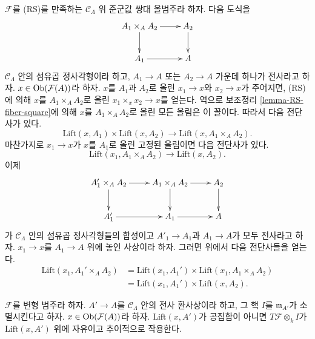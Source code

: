 \begin{remark}
\label{remark-lift-bijections}
$\mathcal{F}$를 (RS)를 만족하는 $\mathcal
C_\Lambda$ 위 준군값 쌍대 올범주라 하자. 다음 도식을
$$
\xymatrix{
A_1 \times_A A_2 \ar[r] \ar[d] & A_2 \ar[d] \\
A_1 \ar[r] & A
}
$$
$\mathcal{C}_\Lambda$ 안의 섬유곱 정사각형이라 하고,
$A_1 \to A$ 또는 $A_2 \to A$ 가운데 하나가 전사라고 하자.
$x \in \mathop{\mathrm{Ob}}\nolimits(\mathcal{F}(A))$라 하자. $x$를 $A_1$과 $A_2$로 올린
$x_1 \to x$와 $x_2 \to x$가 주어지면, (RS)에 의해
$x$를 $A_1 \times_A A_2$로 올린
$x_1 \times_x x_2 \to x$를 얻는다. 역으로 보조정리
\ref{lemma-RS-fiber-square}에 의해 $x$를 $A_1 \times_A A_2$로 올린
모든 올림은 이 꼴이다. 따라서 다음 전단사가 있다. %
$$
\text{Lift}(x, A_1) \times \text{Lift}(x, A_2)
\longrightarrow
\text{Lift}(x, A_1 \times_A A_2).
$$
마찬가지로 $x_1 \to x$가 $x$를 $A_1$로 올린 고정된 올림이면
다음 전단사가 있다.
$$
\text{Lift}(x_1, A_1 \times_A A_2)
\longrightarrow
\text{Lift}(x, A_2).
$$
이제
$$
\xymatrix{
A_1' \times_A A_2 \ar[r] \ar[d] & A_1 \times_A A_2 \ar[r] \ar[d] & A_2
\ar[d] \\
A_1' \ar[r] & A_1 \ar[r] & A
}
$$
가 $\mathcal{C}_\Lambda$ 안의 섬유곱 정사각형들의 합성이고
$A'_1 \to A_1$과 $A_1 \to A$가 모두 전사라고 하자.
$x_1 \to x$를 $A_1 \to A$ 위에 놓인 사상이라 하자.
그러면 위에서 다음 전단사들을 얻는다.
\begin{align*}
\text{Lift}(x_1, A_1' \times_A A_2)
& = \text{Lift}(x_1, A_1') \times \text{Lift}(x_1, A_1 \times_A A_2) \\
& = \text{Lift}(x_1, A_1') \times \text{Lift}(x, A_2).
\end{align*}
\end{remark}

\begin{lemma}
\label{lemma-free-transitive-action}
$\mathcal{F}$를 변형 범주라 하자. $A' \to A$를
$\mathcal{C}_\Lambda$ 안의 전사 환사상이라 하고, 그 핵 $I$를
$\mathfrak m_{A'}$가 소멸시킨다고 하자. $x \in \mathop{\mathrm{Ob}}\nolimits(\mathcal{F}(A))$라 하자.
$\text{Lift}(x, A')$가 공집합이 아니면
$T\mathcal{F} \otimes_k I$가 $\text{Lift}(x, A')$ 위에
자유이고 추이적으로 작용한다.
\end{lemma}

